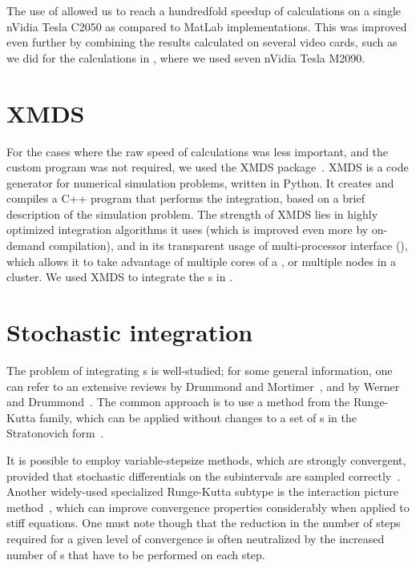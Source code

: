 The use of  allowed us to reach a hundredfold speedup of calculations on a single nVidia Tesla C2050 as compared to MatLab implementations.
This was improved even further by combining the results calculated on several video cards, such as we did for the calculations in , where we used seven nVidia Tesla M2090.


\section{XMDS}

For the cases where the raw speed of calculations was less important, and the custom  program was not required, we used the XMDS package~\cite{Collecutt2001,Dennis2013}.
XMDS is a code generator for numerical simulation problems, written in Python.
It creates and compiles a C++ program that performs the integration, based on a brief  description of the simulation problem.
The strength of XMDS lies in highly optimized integration algorithms it uses (which is improved even more by on-demand compilation), and in its transparent usage of multi-processor interface (), which allows it to take advantage of multiple cores of a , or multiple nodes in a cluster.
We used XMDS to integrate the s in .


\section{Stochastic integration}

The problem of integrating s is well-studied; for some general information, one can refer to an extensive reviews by Drummond and Mortimer~\cite{Drummond1990}, and by Werner and Drummond~\cite{Werner1997}.
The common approach is to use a method from the Runge-Kutta family, which can be applied without changes to a set of s in the Stratonovich form~\cite{Wilkie2004,Wilkie2005}.

It is possible to employ variable-stepsize methods, which are strongly convergent, provided that stochastic differentials on the subintervals are sampled correctly~\cite{Wilkie2005}.
Another widely-used specialized Runge-Kutta subtype is the  interaction picture method~\cite{CaradocDavies2000}, which can improve convergence properties considerably when applied to stiff equations.
One must note though that the reduction in the number of steps required for a given level of convergence is often neutralized by the increased number of s that have to be performed on each step.

